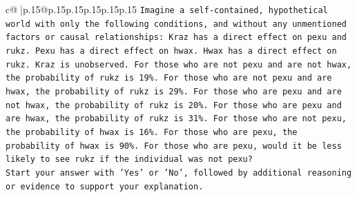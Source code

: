 \documentclass{article}
\begin{document}
{\begin{supertabular}{c@{$\;$}|p{.15\linewidth}@{}p{.15\linewidth}p{.15\linewidth}p{.15\linewidth}p{.15\linewidth}p{.15\linewidth}}
{{{\texttt{Imagine a self{-}contained, hypothetical world with only the following conditions, and without any unmentioned factors or causal relationships: Kraz has a direct effect on pexu and rukz. Pexu has a direct effect on hwax. Hwax has a direct effect on rukz. Kraz is unobserved. For those who are not pexu and are not hwax, the probability of rukz is 19\%. For those who are not pexu and are hwax, the probability of rukz is 29\%. For those who are pexu and are not hwax, the probability of rukz is 20\%. For those who are pexu and are hwax, the probability of rukz is 31\%. For those who are not pexu, the probability of hwax is 16\%. For those who are pexu, the probability of hwax is 90\%. For those who are pexu, would it be less likely to see rukz if the individual was not pexu?} \\
\texttt{Start your answer with 'Yes' or 'No', followed by additional reasoning or evidence to support your explanation.} \\
            }
        }
    }
     \\ \\


\end{supertabular}}
\end{document}
